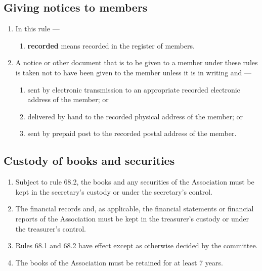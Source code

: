 \documentclass[../constitution.tex]{subfiles}
\begin{document}
\hypertarget{giving-notices-to-members}{%
\subsection{Giving notices to members}\label{giving-notices-to-members}}

\begin{enumerate}

\item In this rule ---

  \begin{enumerate}
  
  \item \textbf{recorded} means recorded in the register of members.
  \end{enumerate}
\item A notice or other document that is to be given to a member under these rules is taken not to have been given to the member unless it is in writing and ---

  \begin{enumerate}
  
  \item sent by electronic transmission to an appropriate recorded electronic address of the member; or
  \item delivered by hand to the recorded physical address of the member; or
  \item sent by prepaid post to the recorded postal address of the member.
  \end{enumerate}
\end{enumerate}

\hypertarget{custody-of-books-and-securities}{%
\subsection{Custody of books and securities}\label{custody-of-books-and-securities}}

\begin{enumerate}

\item Subject to rule 68.2, the books and any securities of the Association must be kept in the secretary's custody or under the secretary's control.
\item The financial records and, as applicable, the financial statements or financial reports of the Association must be kept in the treasurer's custody or under the treasurer's control.
\item Rules 68.1 and 68.2 have effect except as otherwise decided by the committee.
\item The books of the Association must be retained for at least 7 years.
\end{enumerate}
\end{document}
